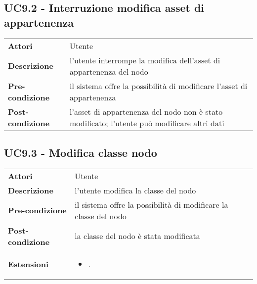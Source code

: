 \subsection{UC9.2 - Interruzione modifica asset di appartenenza}
\label{sssec:UC9.2}
\def\arraystretch{1.5}
\begin{tabularx}{\textwidth}{l|p{}}
\rowcolor{I} \multicolumn{2}{c}{\color{white}\textbf{UC9.2 - Interruzione modifica asset di appartenenza}} \\
\toprule
\endhead
\textbf{Attori} & Utente\\
\textbf{Descrizione} & l'utente interrompe la modifica dell'asset di appartenenza del nodo\\
\textbf{Pre-condizione} & il sistema offre la possibilità di modificare l'asset di appartenenza\\
\textbf{Post-condizione} & l'asset di appartenenza del nodo non è stato modificato; l'utente può modificare altri dati\\
\bottomrule
\end{tabularx}
\subsection{UC9.3 - Modifica classe nodo}
\label{sssec:UC9.3}
\def\arraystretch{1.5}
\begin{tabularx}{\textwidth}{l|p{}}
\rowcolor{I} \multicolumn{2}{c}{\color{white}\textbf{UC9.3 - Modifica classe nodo}} \\
\toprule
\endhead
\textbf{Attori} & Utente\\
\textbf{Descrizione} & l'utente modifica la classe del nodo\\
\textbf{Pre-condizione} & il sistema offre la possibilità di modificare la classe del nodo\\
\textbf{Post-condizione} & la classe del nodo è stata modificata\\
\textbf{Estensioni} & \vspace{-1.2em}\begin{itemize}[leftmargin=*,noitemsep,nosep]
\item \nameref{sssec:UC9.4}.
\end{itemize}\\
\bottomrule
\end{tabularx}
